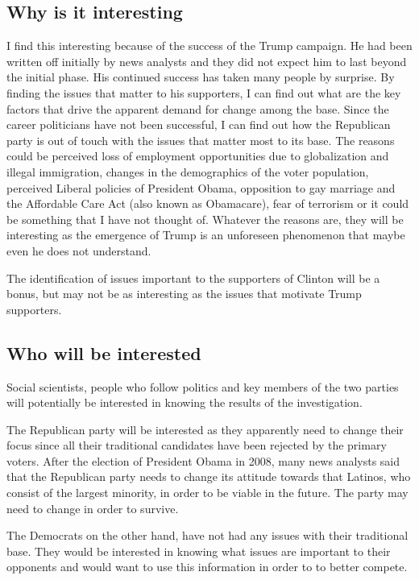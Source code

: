 \documentclass{sig-alternate-05-2015}
\begin{document}
\subsection{Why is it interesting}
I find this interesting because of the success of the Trump campaign. He had been written off initially by news analysts and they did not expect him to last beyond the initial phase. His continued success has taken many people by surprise. By finding the issues that matter to his supporters, I can find out what are the key factors that drive the apparent demand for change among the base. Since the career politicians have not been successful, I can find out how the Republican party is out of touch with the issues that matter most to its base. The reasons could be perceived loss of employment opportunities due to globalization and illegal immigration, changes in the demographics of the voter population, perceived Liberal policies of President Obama, opposition to gay marriage and the Affordable Care Act (also known as Obamacare), fear of terrorism or it could be something that I have not thought of. Whatever the reasons are, they will be interesting as the emergence of Trump is an unforeseen phenomenon that maybe even he does not understand.

The identification of issues important to the supporters of Clinton will be a bonus, but may not be as interesting as the issues that motivate Trump supporters.

\subsection{Who will be interested}
Social scientists, people who follow politics and key members of the two parties will potentially be interested in knowing the results of the investigation. 

The Republican party will be interested as they apparently need to change their focus since all their traditional candidates have been rejected by the primary voters. After the election of President Obama in 2008, many news analysts said that the Republican party needs to change its attitude towards that Latinos, who consist of the largest minority, in order to be viable in the future. The party may need to change in order to survive.  

The Democrats on the other hand, have not had any issues with their traditional base. They would be interested in knowing what issues are important to their opponents and would want to use this information in order to to better compete.
\end{document}
